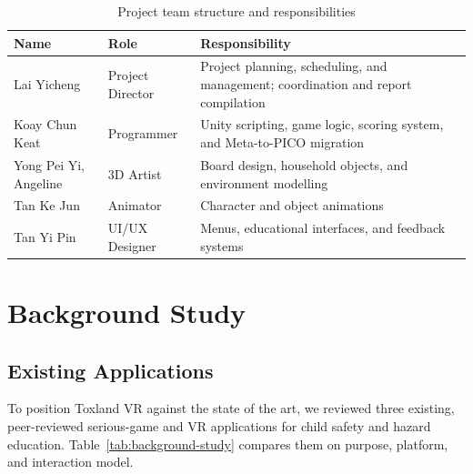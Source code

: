 \documentclass[a4paper,12pt]{article}
\begin{document}
\begin{table}[H]
\centering
\caption{Project team structure and responsibilities}
\label{tab:team-structure}
\renewcommand{\arraystretch}{1.35}
\begin{tabularx}{\textwidth}{|>{\raggedright\arraybackslash}p{4cm}|>{\raggedright\arraybackslash}p{3.5cm}|>{\raggedright\arraybackslash}X|}
\hline
\textbf{Name} & \textbf{Role} & \textbf{Responsibility} \\
\hline
Lai Yicheng & Project Director & Project planning, scheduling, and management; coordination and report compilation \\
\hline
Koay Chun Keat & Programmer & Unity scripting, game logic, scoring system, and Meta-to-PICO migration \\
\hline
Yong Pei Yi, Angeline & 3D Artist & Board design, household objects, and environment modelling \\
\hline
Tan Ke Jun & Animator & Character and object animations \\
\hline
Tan Yi Pin & UI/UX Designer & Menus, educational interfaces, and feedback systems \\
\hline
\end{tabularx}
\end{table}

\section{Background Study}

\subsection{Existing Applications}

To position Toxland VR against the state of the art, we reviewed three existing, peer-reviewed serious-game and VR applications for child safety and hazard education. Table~\ref{tab:background-study} compares them on purpose, platform, and interaction model.
\end{document}
